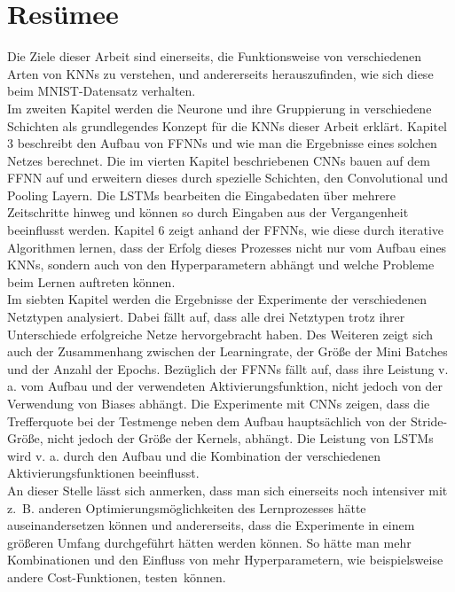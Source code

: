 \documentclass[
	a4paper,
	12pt,
	ngerman,
	oneside
]{scrreprt}											%
\begin{document}
			
			
	\chapter{Resümee}
		Die Ziele dieser Arbeit sind einerseits, die Funktionsweise von verschiedenen Arten von KNNs zu verstehen, und andererseits herauszufinden, wie sich diese beim MNIST-Datensatz verhalten. \\
			
		Im zweiten Kapitel werden die Neurone und ihre Gruppierung in verschiedene Schichten als grundlegendes Konzept für die KNNs dieser Arbeit erklärt. Kapitel 3 beschreibt den Aufbau von FFNNs und wie man die Ergebnisse eines solchen Netzes berechnet. Die im vierten Kapitel beschriebenen CNNs bauen auf dem FFNN auf und erweitern dieses durch spezielle Schichten, den Convolutional und Pooling Layern. Die LSTMs bearbeiten die Eingabedaten über mehrere Zeitschritte hinweg und können so durch Eingaben aus der Vergangenheit beeinflusst werden. Kapitel 6 zeigt anhand der FFNNs, wie diese durch iterative Algorithmen lernen, dass der Erfolg dieses Prozesses nicht nur vom Aufbau eines KNNs, sondern auch von den Hyperparametern abhängt und welche Probleme beim Lernen auftreten können. \\
			
		Im siebten Kapitel werden die Ergebnisse der Experimente der verschiedenen Netztypen analysiert. Dabei fällt auf, dass alle drei Netztypen trotz ihrer Unterschiede erfolgreiche Netze hervorgebracht haben. Des Weiteren zeigt sich auch der Zusammenhang zwischen der Learningrate, der Größe der Mini Batches und der Anzahl der Epochs. Bezüglich der FFNNs fällt auf, dass ihre Leistung v. a. vom Aufbau und der verwendeten Aktivierungsfunktion, nicht jedoch von der Verwendung von Biases abhängt. Die Experimente mit CNNs zeigen, dass die Trefferquote bei der Testmenge neben dem Aufbau hauptsächlich von der Stride-Größe, nicht jedoch der Größe der Kernels, abhängt. Die Leistung von LSTMs wird v. a. durch den Aufbau und die Kombination der verschiedenen Aktivierungsfunktionen beeinflusst. \\
			
		An dieser Stelle lässt sich anmerken, dass man sich einerseits noch intensiver mit \mbox{z. B.} anderen Optimierungsmöglichkeiten des Lernprozesses hätte auseinandersetzen können und andererseits, dass die Experimente in einem größeren Umfang durchgeführt hätten werden können. So hätte man mehr Kombinationen und den Einfluss von mehr Hyperparametern, wie beispielsweise andere Cost-Funktionen, \mbox{testen können.}
		
\end{document}

